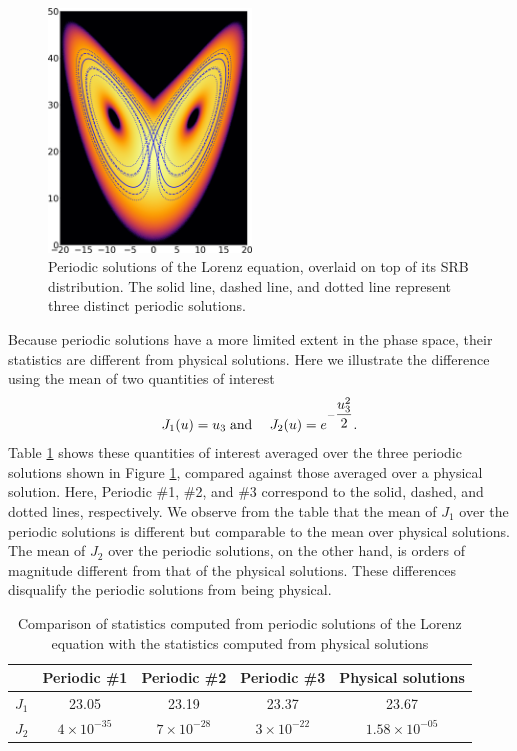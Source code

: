 \begin{figure}\centering
\includegraphics[width=0.48\textwidth]{lorenz_periodic.png}
\caption{Periodic solutions of the Lorenz equation, overlaid on top of
its SRB distribution.  The solid line, dashed line, and dotted line
represent three distinct periodic solutions.}
\label{fig:lorenz_periodic}
\end{figure}

Because periodic solutions have a more limited extent in the phase space, their
statistics are different from physical solutions.
Here we illustrate the difference using the mean of two
quantities of interest
\begin{align}
		J_1(u) = u_3\;{\rm and}\;\quad J_2(u) = e^{-\dfrac{u_3^2}2}.
\end{align}
Table \ref{tab:lorenz_periodic_stats} shows these quantities
of interest averaged over the three periodic solutions shown in Figure
\ref{fig:lorenz_periodic}, compared against those averaged over a
physical solution.  Here, Periodic \#1, \#2, and \#3 correspond to
the solid, dashed, and dotted lines, respectively.
We observe from the table that the mean of $J_1$ over the periodic
solutions is different but comparable to the mean over physical solutions.  The mean of $J_2$ over the periodic solutions, on the other hand,
is orders of magnitude different from that of the physical solutions.
These differences disqualify the periodic solutions from being physical.
\begin{table}[H]
    \centering
    \begin{tabular}{c|c|c|c|c}
             & Periodic \#1 & Periodic \#2
             & Periodic \#3 & Physical solutions \\
    \hline
        $J_1$& 23.05 &
               23.19 &
               23.37 &
               23.67 \\
        $J_2$&$4\times 10^{-35}$&
              $7\times 10^{-28}$&
              $3\times 10^{-22}$&
              $1.58\times 10^{-05}$
    \end{tabular}
    \caption{Comparison of statistics computed from periodic solutions of the Lorenz equation with the statistics computed from physical solutions}
    \label{tab:lorenz_periodic_stats}
\end{table}

